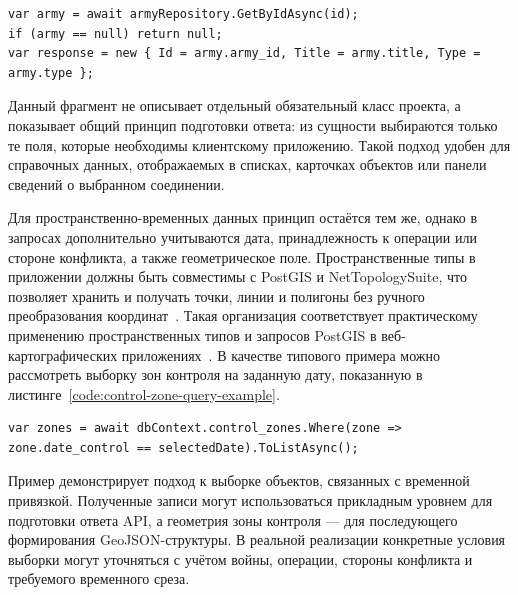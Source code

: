 \begin{code}
\label{code:army-response-example}
\vspace{-0.75cm}
\begin{verbatim}
var army = await armyRepository.GetByIdAsync(id);
if (army == null) return null;
var response = new { Id = army.army_id, Title = army.title, Type = army.type };
\end{verbatim}
\end{code}

Данный фрагмент не описывает отдельный обязательный класс проекта, а показывает общий принцип подготовки ответа: из сущности выбираются только те поля, которые необходимы клиентскому приложению. Такой подход удобен для справочных данных, отображаемых в списках, карточках объектов или панели сведений о выбранном соединении.

Для пространственно-временных данных принцип остаётся тем же, однако в запросах дополнительно учитываются дата, принадлежность к операции или стороне конфликта, а также геометрическое поле. Пространственные типы в приложении должны быть совместимы с PostGIS и NetTopologySuite, что позволяет хранить и получать точки, линии и полигоны без ручного преобразования координат~\cite{npgsql_postgis_nts}. Такая организация соответствует практическому применению пространственных типов и запросов PostGIS в веб-картографических приложениях~\cite{obe_hsu_postgis_in_action}. В качестве типового примера можно рассмотреть выборку зон контроля на заданную дату, показанную в листинге~\ref{code:control-zone-query-example}.

\begin{code}
\label{code:control-zone-query-example}
\vspace{-0.75cm}
\begin{verbatim}
var zones = await dbContext.control_zones.Where(zone => zone.date_control == selectedDate).ToListAsync();
\end{verbatim}
\end{code}

Пример демонстрирует подход к выборке объектов, связанных с временной привязкой. Полученные записи могут использоваться прикладным уровнем для подготовки ответа API, а геометрия зоны контроля --- для последующего формирования GeoJSON-структуры. В реальной реализации конкретные условия выборки могут уточняться с учётом войны, операции, стороны конфликта и требуемого временного среза.

